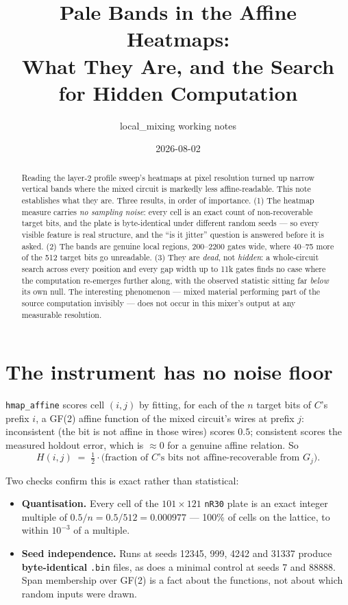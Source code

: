 \documentclass[11pt]{article}
\title{Pale Bands in the Affine Heatmaps:\\
What They Are, and the Search for Hidden Computation}
\author{local\_mixing working notes}
\date{2026-08-02}
\newcommand{\code}[1]{\texttt{#1}}
\begin{document}
\maketitle

\begin{abstract}
Reading the layer-2 profile sweep's heatmaps at pixel resolution turned up
narrow vertical bands where the mixed circuit is markedly less
affine-readable. This note establishes what they are. Three results, in
order of importance. (1) The heatmap measure carries \emph{no sampling
noise}: every cell is an exact count of non-recoverable target bits, and
the plate is byte-identical under different random seeds --- so every
visible feature is real structure, and the ``is it jitter'' question is
answered before it is asked. (2) The bands are genuine local regions,
200--2200 gates wide, where 40--75 more of the 512 target bits go
unreadable. (3) They are \emph{dead}, not \emph{hidden}: a whole-circuit
search across every position and every gap width up to 11k gates finds no
case where the computation re-emerges further along, with the observed
statistic sitting far \emph{below} its own null. The interesting
phenomenon --- mixed material performing part of the source computation
invisibly --- does not occur in this mixer's output at any measurable
resolution.
\end{abstract}

\section{The instrument has no noise floor}

\code{hmap\_affine} scores cell $(i,j)$ by fitting, for each of the $n$
target bits of $C$'s prefix $i$, a GF(2) affine function of the mixed
circuit's wires at prefix $j$: inconsistent (the bit is not affine in those
wires) scores $0.5$; consistent scores the measured holdout error, which is
$\approx 0$ for a genuine affine relation. So
\[
H(i,j) \;=\; \tfrac{1}{2}\cdot\bigl(\text{fraction of $C$'s bits not
affine-recoverable from $G_j$}\bigr).
\]

Two checks confirm this is exact rather than statistical:

\begin{itemize}
\item \textbf{Quantisation.} Every cell of the $101 \times 121$ \code{nR30}
plate is an exact integer multiple of $0.5/n = 0.5/512 = 0.000977$
--- 100\% of cells on the lattice, to within $10^{-3}$ of a multiple.
\item \textbf{Seed independence.} Runs at seeds 12345, 999, 4242 and 31337
produce \textbf{byte-identical} \code{.bin} files, as does a minimal control
at seeds 7 and 88888. Span membership over GF(2) is a fact about the
functions, not about which random inputs were drawn.
\end{itemize}
\end{document}
